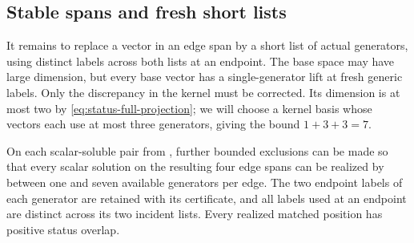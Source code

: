 \subsection{Stable spans and fresh short lists}

It remains to replace a vector in an edge span by a short list of actual
generators, using distinct labels across both lists at an endpoint.
The base space may have large dimension, but every base vector has a
single-generator lift at fresh generic labels. Only the discrepancy in
the kernel must be corrected. Its dimension is at most two by
\eqref{eq:status-full-projection}; we will choose a kernel basis whose
vectors each use at most three generators, giving the bound $1+3+3=7$.

\begin{lemma}
\label{lem:fresh-lists}
On each scalar-soluble pair from , further bounded
exclusions can be made so that every scalar solution on the resulting
four edge spans can be realized by between one and seven available
generators per edge. The two endpoint labels of each generator are
retained with its certificate, and all labels used at an endpoint are
distinct across its two incident lists. Every realized matched
position has positive status overlap.
\end{lemma}


